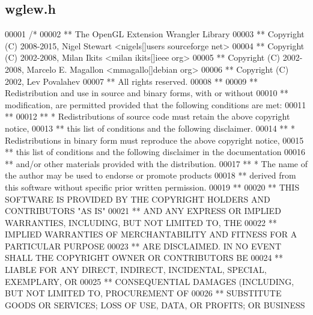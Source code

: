 \subsection{wglew.\+h}
\label{wglew_8h_source}

\begin{DoxyCode}
00001 \textcolor{comment}{/*}
00002 \textcolor{comment}{** The OpenGL Extension Wrangler Library}
00003 \textcolor{comment}{** Copyright (C) 2008-2015, Nigel Stewart <nigels[]users sourceforge net>}
00004 \textcolor{comment}{** Copyright (C) 2002-2008, Milan Ikits <milan ikits[]ieee org>}
00005 \textcolor{comment}{** Copyright (C) 2002-2008, Marcelo E. Magallon <mmagallo[]debian org>}
00006 \textcolor{comment}{** Copyright (C) 2002, Lev Povalahev}
00007 \textcolor{comment}{** All rights reserved.}
00008 \textcolor{comment}{** }
00009 \textcolor{comment}{** Redistribution and use in source and binary forms, with or without }
00010 \textcolor{comment}{** modification, are permitted provided that the following conditions are met:}
00011 \textcolor{comment}{** }
00012 \textcolor{comment}{** * Redistributions of source code must retain the above copyright notice, }
00013 \textcolor{comment}{**   this list of conditions and the following disclaimer.}
00014 \textcolor{comment}{** * Redistributions in binary form must reproduce the above copyright notice, }
00015 \textcolor{comment}{**   this list of conditions and the following disclaimer in the documentation }
00016 \textcolor{comment}{**   and/or other materials provided with the distribution.}
00017 \textcolor{comment}{** * The name of the author may be used to endorse or promote products }
00018 \textcolor{comment}{**   derived from this software without specific prior written permission.}
00019 \textcolor{comment}{**}
00020 \textcolor{comment}{** THIS SOFTWARE IS PROVIDED BY THE COPYRIGHT HOLDERS AND CONTRIBUTORS "AS IS" }
00021 \textcolor{comment}{** AND ANY EXPRESS OR IMPLIED WARRANTIES, INCLUDING, BUT NOT LIMITED TO, THE }
00022 \textcolor{comment}{** IMPLIED WARRANTIES OF MERCHANTABILITY AND FITNESS FOR A PARTICULAR PURPOSE}
00023 \textcolor{comment}{** ARE DISCLAIMED. IN NO EVENT SHALL THE COPYRIGHT OWNER OR CONTRIBUTORS BE }
00024 \textcolor{comment}{** LIABLE FOR ANY DIRECT, INDIRECT, INCIDENTAL, SPECIAL, EXEMPLARY, OR }
00025 \textcolor{comment}{** CONSEQUENTIAL DAMAGES (INCLUDING, BUT NOT LIMITED TO, PROCUREMENT OF }
00026 \textcolor{comment}{** SUBSTITUTE GOODS OR SERVICES; LOSS OF USE, DATA, OR PROFITS; OR BUSINESS}

\end{DoxyCode}
